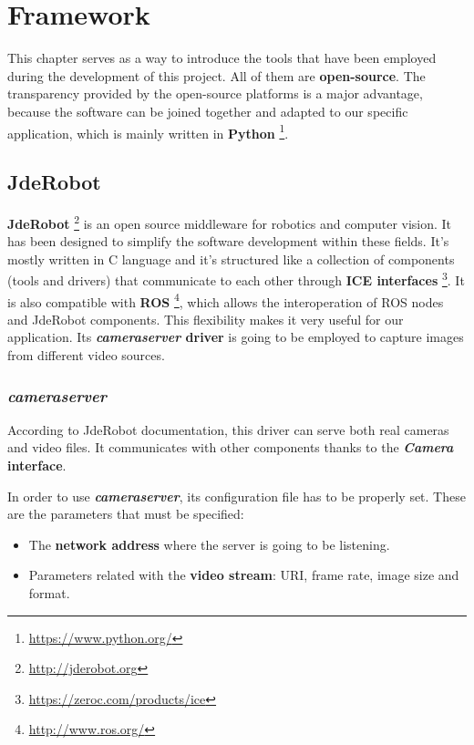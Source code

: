\chapter{Framework}\label{ch:framework}
This chapter serves as a way to introduce the tools that have been employed during the development of this project. All of them are \textbf{open-source}. The transparency provided by the open-source platforms is a major advantage, because the software can be joined together and adapted to our specific application, which is mainly written in \textbf{Python} \footnote{\url{https://www.python.org/}}.

\section{JdeRobot}\label{sec:jderobot}
\textbf{JdeRobot} \footnote{\url{http://jderobot.org}} is an open source middleware for robotics and computer vision. It has been designed to simplify the software development within these fields. It's mostly written in C\nolinebreak[4]\hspace{-.05em}\raisebox{.4ex}{\tiny\bf ++} language and it's structured like a collection of components (tools and drivers) that communicate to each other through \textbf{ICE interfaces} \footnote{\url{https://zeroc.com/products/ice}}. It is also compatible with \textbf{ROS} \footnote{\url{http://www.ros.org/}}, which allows the interoperation of ROS nodes and JdeRobot components. This flexibility makes it very useful for our application.
Its \textbf{\textit{cameraserver} driver} is going to be employed to capture images from different video sources.

\subsection{\textit{cameraserver}}\label{subsec:cameraserver}
According to JdeRobot documentation, this driver can serve both real cameras and video files. It communicates with other components thanks to the \textbf{\textit{Camera} interface}.

In order to use \textbf{\textit{cameraserver}}, its configuration file has to be properly set. These are the parameters that must be specified:
\begin{itemize}
    \item The \textbf{network address} where the server is going to be listening.
    
    \item Parameters related with the \textbf{video stream}: URI, frame rate, image size and format.
\end{itemize}

